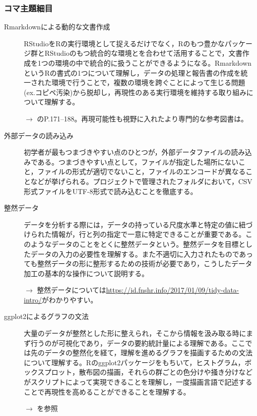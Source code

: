 \subsubsection{コマ主題細目}
\begin{description}
	\item[Rmarkdownによる動的な文書作成]RStudioをRの実行環境として捉えるだけでなく，Rのもつ豊かなパッケージ群とRStudioのもつ統合的な環境とを合わせて活用することで，文書作成を1つの環境の中で統合的に扱うことができるようになる。RmarkdownというRの書式の1つについて理解し，データの処理と報告書の作成を統一された環境で行うことで，複数の環境を跨ぐことによって生じる問題(ex.コピペ汚染)から脱却し，再現性のある実行環境を維持する取り組みについて理解する。
	      \begin{flushright}
		      $\to$ \citet{kosugi2019}のP.171--188。再現可能性も視野に入れたより専門的な参考図書は\citet{Takahashi201805}。
	      \end{flushright}

	\item[外部データの読み込み]初学者が最もつまづきやすい点のひとつが，外部データファイルの読み込みである。つまづきやすい点として，ファイルが指定した場所にないこと，ファイルの形式が適切でないこと，ファイルのエンコードが異なることなどが挙げられる。プロジェクトで管理されたフォルダにおいて，CSV形式ファイルをUTF-8形式で読み込むことを徹底する。

	\item[整然データ]データを分析する際には，データの持っている尺度水準と特定の値に紐づけられた情報が，行と列の指定で一意に特定できることが重要である。このようなデータのことをとくに整然データという。整然データを目標としたデータの入力の必要性を理解する。また不適切に入力されたものであっても整然データの形に整形するための技術が必要であり，こうしたデータ加工の基本的な操作について説明する。
	      \begin{flushright}
		      $\to$ 整然データについては\url{https://id.fnshr.info/2017/01/09/tidy-data-intro/}がわかりやすい。
	      \end{flushright}

	\item[ggplot2によるグラフの文法]大量のデータが整然とした形に整えられ，そこから情報を汲み取る時にまず行うのが可視化であり，データの要約統計量による理解である。ここでは先のデータの整然化を経て，理解を進めるグラフを描画するための文法について理解する。Rのggplot2パッケージをもちいて，ヒストグラム，ボックスプロット，散布図の描画，それらの群ごとの色分けや掻き分けなどがスクリプトによって実現できることを理解し，一度描画言語で記述することで再現性を高めることができることを理解する。
	      \begin{flushright}
		      $\to$ \citet{Kinosady2021}を参照
	      \end{flushright}

\end{description}

